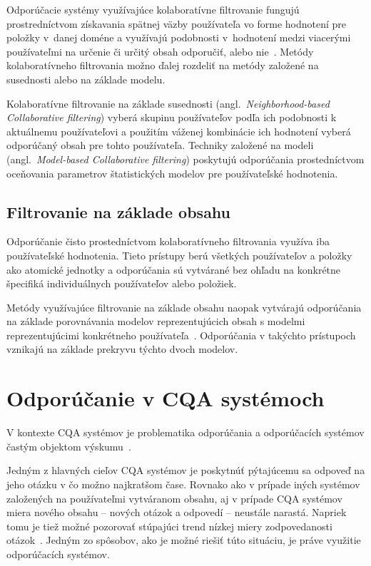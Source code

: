 Odporúčacie systémy využívajúce kolaboratívne filtrovanie fungujú prostredníctvom získavania spätnej väzby používateľa
vo forme hodnotení pre položky v~danej doméne a využívajú podobnosti v~hodnotení medzi viacerými používateľmi na určenie
či určitý obsah odporučiť, alebo nie~\cite{Buhmann2011}. Metódy kolaboratívneho filtrovania možno ďalej rozdeliť
na metódy založené na susednosti alebo na základe modelu.

Kolaboratívne filtrovanie na základe susednosti (angl.~\emph{Neighborhood-based Collaborative filtering})
vyberá skupinu používateľov podľa ich podobnosti k aktuálnemu používateľovi
a použitím váženej kombinácie ich hodnotení vyberá odporúčaný obsah pre tohto používateľa.
Techniky založené na modeli (angl.~\emph{Model-based Collaborative filtering}) poskytujú odporúčania prostedníctvom
oceňovania parametrov štatistických modelov pre používateľské hodnotenia.

\subsection{Filtrovanie na základe obsahu}\label{rec:content}

Odporúčanie čisto prostedníctvom kolaboratívneho filtrovania využíva iba používateľské hodnotenia. Tieto prístupy berú
všetkých používateľov a položky ako atomické jednotky a odporúčania sú vytvárané bez ohľadu na konkrétne špecifiká
individuálnych používateľov alebo položiek.

Metódy využívajúce filtrovanie na základe obsahu naopak vytvárajú
odporúčania na základe porovnávania modelov reprezentujúcich obsah s modelmi reprezentujúcimi konkrétneho používateľa~\cite{Handbook2011}.
Odporúčania v takýchto prístupoch vznikajú na základe prekryvu týchto dvoch modelov.


\section{Odporúčanie v CQA systémoch}

V kontexte CQA systémov je problematika odporúčania a odporúčacích systémov častým objektom výskumu~\cite{Srba2016}.

Jedným z hlavných cieľov CQA systémov je poskytnúť pýtajúcemu sa odpoveď na jeho otázku v čo možno najkratšom čase.
Rovnako ako v prípade iných systémov založených na používateľmi vytváranom obsahu, aj v prípade CQA systémov miera
nového obsahu -- nových otázok a odpovedí -- neustále narastá. Napriek tomu je tiež možné pozorovať stúpajúci trend
nízkej miery zodpovedanosti otázok~\cite{Srba2016SOFail}. Jedným zo spôsobov, ako je možné riešiť túto situáciu,
je práve využitie odporúčacích systémov.

